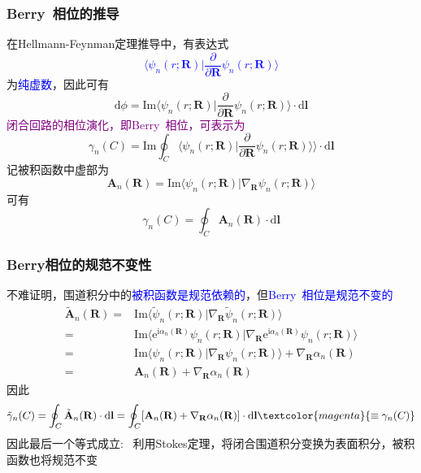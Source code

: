 {\frame
{
	\frametitle{\textrm{Berry~}相位的推导}
	在\textrm{Hellmann-Feynman}定理推导中，有表达式
	\textcolor{blue}{\begin{displaymath}
		\langle\psi_n(r;\mathbf{R})|\dfrac{\partial}{\partial\mathbf{R}}\psi_n(r;\mathbf{R})\rangle
	\end{displaymath}}
	为\textcolor{blue}{纯虚数}，因此可有
	\begin{displaymath}
		\mathrm{d}\phi=\mathrm{Im}\langle\psi_n(r;\mathbf{R})|\dfrac{\partial}{\partial\mathbf{R}}\psi_n(r;\mathbf{R})\rangle\cdot\mathrm{d}\mathbf{l}
	\end{displaymath}
	\textcolor{purple}{闭合回路的相位演化，即\textrm{Berry~}相位，可表示为}
	\begin{displaymath}
		\gamma_n(C)=\mathrm{Im}\oint_C\langle\psi_n(r;\mathbf{R})|\dfrac{\partial}{\partial\mathbf{R}}\psi_n(r;\mathbf{R})\rangle\rangle\cdot\mathrm{d}\mathbf{l}
	\end{displaymath}
	记被积函数中虚部为
	\begin{displaymath}
		\mathbf{A}_n(\mathbf{R})=\mathrm{Im}\langle\psi_n(r;\mathbf{R})|\nabla_{\mathbf{R}}\psi_n(r;\mathbf{R})\rangle
	\end{displaymath}
	可有
	\begin{displaymath}
		\gamma_n(C)=\oint_C\mathbf{A}_n(\mathbf{R})\cdot\mathrm{d}\mathbf{l}
	\end{displaymath}
}

\frame
{
	\frametitle{\rm{Berry}相位的规范不变性}
	不难证明，围道积分中的\textcolor{blue}{被积函数是规范依赖的}，但\textcolor{blue}{\textrm{Berry~}相位是规范不变的}
	\begin{displaymath}
		\begin{aligned}
			\tilde{\mathbf{A}}_n(\mathbf{R})=&\mathrm{Im}\langle\tilde{\psi}_n(r;\mathbf{R})|\nabla_{\mathbf{R}}\tilde{\psi}_n(r;\mathbf{R})\rangle\\
			=&\mathrm{Im}\langle\mathrm{e}^{\mathrm{i}\alpha_n(\mathbf{R})}\psi_n(r;\mathbf{R})|\nabla_{\mathbf{R}}\mathrm{e}^{\mathrm{i}\alpha_n(\mathbf{R})}\psi_n(r;\mathbf{R})\rangle\\
			=&\mathrm{Im}\langle\psi_n(r;\mathbf{R})|\nabla_{\mathbf{R}}\psi_n(r;\mathbf{R})\rangle+\nabla_{\mathbf{R}}\alpha_n(\mathbf{R})\\
			=&\mathbf{A}_n(\mathbf{R})+\nabla_{\mathbf{R}}\alpha_n(\mathbf{R})
		\end{aligned}
	\end{displaymath}
	因此
	\begin{displaymath}
		\tilde\gamma_n(C)=\oint_C\tilde{\mathbf{A}}_n(\mathbf{R})\cdot\mathrm{d}\mathbf{l}=\oint_C[\mathbf{A}_n(\mathbf{R})+\nabla_{\mathbf{R}}\alpha_n(\mathbf{R})]\cdot\mathrm{d}\mathbf{l}\textcolor{magenta}{\equiv\gamma_n(C)}
	\end{displaymath}
	因此最后一个等式成立:~\textcolor{blue}{\fontsize{8.2pt}{6.2pt}}
\vskip 5pt
	利用\textrm{Stokes}定理，将闭合围道积分变换为表面积分，被积函数也将规范不变
}

}
